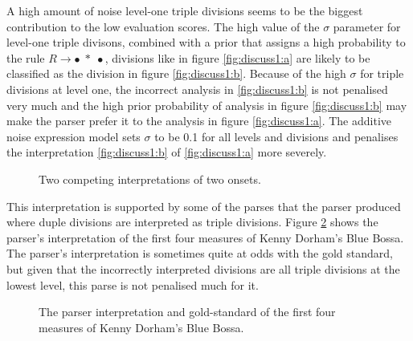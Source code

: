 A high amount of noise level-one triple divisions seems to be the biggest contribution to the low evaluation scores. The high value of the $\sigma$ parameter for level-one triple divisons, combined with a prior that assigns a high probability to the rule $R \rightarrow \bullet\; *\; \bullet$, divisions like in figure \ref{fig:discuss1:a} are likely to be classified as the division in figure \ref{fig:discuss1:b}. Because of the high $\sigma$ for triple divisions at level one, the incorrect analysis in \ref{fig:discuss1:b} is not penalised very much and the high prior probability of analysis in figure \ref{fig:discuss1:b} may make the parser prefer it to the analysis in figure \ref{fig:discuss1:a}. The additive noise expression model sets $\sigma$ to be 0.1 for all levels and divisions and penalises the interpretation \ref{fig:discuss1:b} of \ref{fig:discuss1:a} more severely.

\begin{figure}
\centering
{}
\caption{Two competing interpretations of two onsets.}
\label{fig:discuss1}
\end{figure}

This interpretation is supported by some of the parses that the parser produced where duple divisions are interpreted as triple divisions. Figure \ref{fig:blue_bossa} shows the parser's interpretation of the first four measures of Kenny Dorham's Blue Bossa. The parser's interpretation is sometimes quite at odds with the gold standard, but given that the incorrectly interpreted divisions are all triple divisions at the lowest level, this parse is not penalised much for it.

\begin{figure}
\centering
{}

\caption{The parser interpretation and gold-standard of the first four measures of Kenny Dorham's Blue Bossa.}
\label{fig:blue_bossa}
\end{figure}

